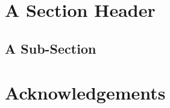 \lipsum[1]

\section{A Section Header}
\lipsum[2-3]\citet{Lewis1981}

\subsection{A Sub-Section}
\lipsum[4-8]

\section*{Acknowledgements}
\lipsum[9]